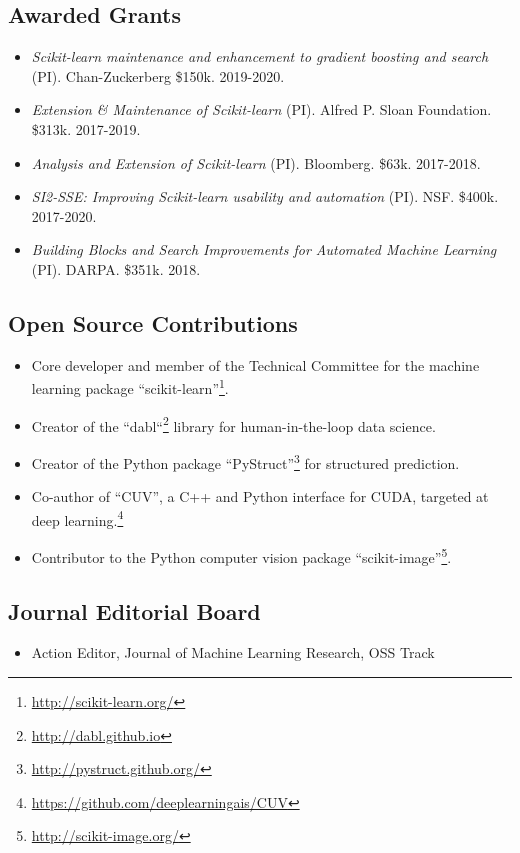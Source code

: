 \documentclass[a4paper,9pt]{article}
\begin{document}
\subsection{Awarded Grants}
\begin{itemize}
    \item \emph{Scikit-learn maintenance and enhancement to gradient boosting and search} (PI). Chan-Zuckerberg \$150k. 2019-2020.
    \item \emph{Extension \& Maintenance of Scikit-learn} (PI). Alfred P. Sloan Foundation. \$313k. 2017-2019.
    \item \emph{Analysis and Extension of Scikit-learn} (PI). Bloomberg. \$63k. 2017-2018.
    \item \emph{SI2-SSE: Improving Scikit-learn usability and automation} (PI). NSF. \$400k. 2017-2020.
    \item \emph{Building Blocks and Search Improvements for Automated Machine Learning} (PI). DARPA. \$351k. 2018.
\end{itemize}

\subsection{Open Source Contributions}
\begin{itemize}
    \item Core developer and member of the Technical Committee for the machine learning package ``scikit-learn''\footnote{\url{http://scikit-learn.org/}}.
    \item Creator of the ``dabl``\footnote{\url{http://dabl.github.io}} library for human-in-the-loop data science.
    \item Creator of the Python package ``PyStruct''\footnote{\url{http://pystruct.github.org/}} for structured prediction.
    \item Co-author of ``CUV'', a C++ and Python interface for CUDA,
        targeted at deep learning.\footnote{\url{https://github.com/deeplearningais/CUV}}
    \item Contributor to the Python computer vision package ``scikit-image''\footnote{\url{http://scikit-image.org/}}.
\end{itemize}

\subsection{Journal Editorial Board}
\begin{itemize}
    \item Action Editor, Journal of Machine Learning Research, OSS Track
\end{itemize}
\end{document}
